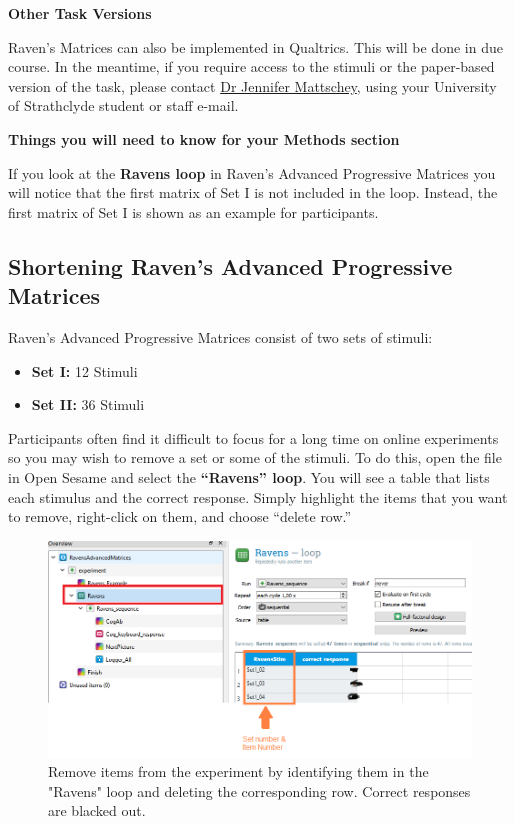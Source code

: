 \documentclass[
]{book}
\providecommand{\tightlist}{%
  \setlength{\itemsep}{0pt}\setlength{\parskip}{0pt}}
\begin{document}
\textbf{Other Task Versions}

Raven's Matrices can also be implemented in Qualtrics. This will be done in due course. In the meantime, if you require access to the stimuli or the paper-based version of the task, please contact \href{mailto:\%20Jennifer.Mattschey@strath.ac.uk}{Dr Jennifer Mattschey}, using your University of Strathclyde student or staff e-mail.

\textbf{Things you will need to know for your Methods section}

If you look at the \textbf{Ravens loop} in Raven's Advanced Progressive Matrices you will notice that the first matrix of Set I is not included in the loop. Instead, the first matrix of Set I is shown as an example for participants.

\hypertarget{shortening-ravens-advanced-progressive-matrices}{%
\subsection{Shortening Raven's Advanced Progressive Matrices}\label{shortening-ravens-advanced-progressive-matrices}}

Raven's Advanced Progressive Matrices consist of two sets of stimuli:

\begin{itemize}
\tightlist
\item
  \textbf{Set I:} 12 Stimuli
\item
  \textbf{Set II:} 36 Stimuli
\end{itemize}

Participants often find it difficult to focus for a long time on online experiments so you may wish to remove a set or some of the stimuli. To do this, open the file in Open Sesame and select the \textbf{``Ravens'' loop}. You will see a table that lists each stimulus and the correct response. Simply highlight the items that you want to remove, right-click on them, and choose ``delete row.''

\begin{figure}

{\centering \includegraphics[width=0.99\linewidth]{images/AdvancedRPM} 

}

\caption{Remove items from the experiment by identifying them in the "Ravens" loop and deleting the corresponding row. Correct responses are blacked out.}\label{fig:Figure1-1}
\end{figure}
\end{document}
